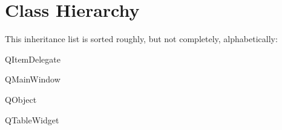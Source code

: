 \section{Class Hierarchy}
This inheritance list is sorted roughly, but not completely, alphabetically\+:\begin{DoxyCompactList}
\item {}
\item {}
\item Q\+Item\+Delegate\begin{DoxyCompactList}
\item {}
\end{DoxyCompactList}
\item Q\+Main\+Window\begin{DoxyCompactList}
\item {}
\end{DoxyCompactList}
\item Q\+Object\begin{DoxyCompactList}
\item {}
\item {}
\item {}
\end{DoxyCompactList}
\item Q\+Table\+Widget\begin{DoxyCompactList}
\item {}
\end{DoxyCompactList}
\item {}
\item {}
\end{DoxyCompactList}
